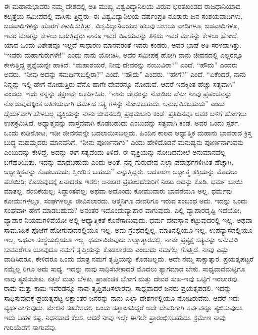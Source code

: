ಈ ಮಹಾನುಭಾವರು ನಮ್ಮ ದೇಶದಲ್ಲಿ ಅತಿ ಮುಖ್ಯ ವಿಶ್ವವಿದ್ಯಾನಿಲಯ ವಿರುವ ಭರತಖಂಡದ ರಾಜಧಾನಿಯಾದ ಕಲ್ಕತ್ತೆಯ ಸಮೀಪದಲ್ಲಿ ವಾಸಿಸು ತ್ತಿದ್ದರು. ಈ ವಿಶ್ವವಿದ್ಯಾನಿಲಯ ವರ್ಷಂಪ್ರತಿ ನೂರಾರು ಜನ ಸಂಶಯವಾದಿಗಳು, ಜಡವಾದಿಗಳನ್ನು ಹೊರಗೆ ಕಳುಹಿಸುತ್ತಿತ್ತು. ವಿಶ್ವವಿದ್ಯಾನಿಲಯದ ಹಲವು ಸಂಶಯ ವಾದಿಗಳೂ, ಜಡವಾದಿಗಳೂ, ಇವರ ಮಾತನ್ನು ಕೇಳಲು ಬರುತ್ತಿದ್ದರು.ನಾನೂ ಇವರ ವಿಷಯವನ್ನು ತಿಳಿದು ಇವರ ಮಾತನ್ನು ಕೇಳಲು ಹೋದೆ. ಯಾವ ಒಂದು ವಿಶೇಷವೂ ಇಲ್ಲದೆ ಸಾಧಾರಣ ಮಾನವರಂತೆ ಇವರು ಕಂಡರು, ಅವರ ಭಾಷೆ ಅತಿ ಸರಳವಾಗಿತ್ತು. “ಇವರು ಮಹಾಗುರುಗಳೇ!” ಎಂದು ನಾನು ಯೋಚಿಸಿ, ಅವರ ಸಮೀಪಕ್ಕೆ ಹೋಗಿ ನಾನು ಜೀವನದಲ್ಲಿ ಎಲ್ಲರನ್ನೂ ಕೇಳುತ್ತಿದ್ದ ಪ್ರಶ್ನೆಯನ್ನೇ ಹಾಕಿದೆ: “ಮಹಾಶಯರೆ, ನೀವು ದೇವರನ್ನು ನಂಬುವಿರಾ?” ಎಂದೆ. “ಹೌದು” ಎಂದರು ಅವರು. “ನೀವು ಅದನ್ನು ಸಮರ್ಥಿಸಬಲ್ಲಿರಾ?” ಎಂದೆ. “ಹೌದು” ಎಂದರು. “ಹೇಗೆ?” ಎಂದೆ. “ಏಕೆಂದರೆ, ನಾನು ನಿನ್ನನ್ನು ಇಲ್ಲಿ ಹೇಗೆ ನೋಡುತ್ತಿರು ವೆನೊ ಹಾಗೇ ದೇವರನ್ನೂ ನೋಡುವೆ. ಆದರೆ ಇದಕ್ಕಿಂತ ಹೆಚ್ಚು ಸತ್ಯವಾಗಿ” ಎಂದರು. ಇದು ನನ್ನನ್ನು ತಕ್ಷಣವೇ ಆಕರ್ಷಿಸಿತು. “ನಾನು ದೇವರನ್ನು ನೋಡಿರು ವೆನು; ನಾವು ಪ್ರಪಂಚವನ್ನು ನೋಡುವುದಕ್ಕಿಂತ ಅತಿಶಯವಾಗಿ ಧರ್ಮದ ಸತ್ಯ ಗಳನ್ನು ನೋಡಬಹುದು. ಅನುಭವಿಸಬಹುದು” ಎಂದು ಧೈರ್ಯವಾಗಿ ಹೇಳಬಲ್ಲ ವ್ಯಕ್ತಿಯನ್ನು ನಾನು ಜೀವನದಲ್ಲಿ ಪ್ರಥಮಬಾರಿ ಕಂಡೆ. ಪ್ರತಿದಿನವೂ ಅವರ ಬಳಿಗೆ ಹೋಗಲು ಉಪಕ್ರಮಿಸಿದೆ. ಅಧ್ಯಾತ್ಮವನ್ನು ವಾಸ್ತವವಾಗಿ ಕೊಡಬಹುದು ಎಂಬುದನ್ನು ಸತ್ಯವಾಗಿ ಕಂಡೆ. ಅವರ ಒಂದು ಸ್ಪರ್ಶ, ಒಂದು ಕುಡಿನೋಟ, ಇಡೀ ಜೀವನವನ್ನೇ ಬದಲಾಯಿಸಬಲ್ಲದು. ಹಿಂದಿನ ಕಾಲದ ಆಧ್ಯಾತ್ಮಿಕ ಮಹಾನು ಭಾವರಾದ ಕ್ರಿಸ್ತ ಬುದ್ಧ ಮಹಮ್ಮದರು ಮಾನವನಿಗೆ, “ನೀನು ಪೂರ್ಣನಾಗು” ಎಂದು ಹೇಳಿದೊಡನೆ ಮನುಷ್ಯನು ಪೂರ್ಣನಾಗುವನು ಎಂಬುದನ್ನು ಕೇಳಿದ್ದೆ. ಅದನ್ನು ಈಗ ಸತ್ಯವೆಂದು ತಿಳಿದೆ. ಈ ವ್ಯಕ್ತಿಯನ್ನು ನೋಡಿದಮೇಲೆ ಅನುಮಾನವೆಲ್ಲ ಬಗೆಹರಿಯಿತು. ಇದನ್ನು ಮಾಡಬಹುದು ಎಂದು ಅರಿತೆ. ನನ್ನ ಗುರುದೇವ ಎಲ್ಲಾ ಪದಾರ್ಥಗಳಿಗಿಂತ ಹೆಚ್ಚಾಗಿ, ಆಧ್ಯಾತ್ಮಿಕವನ್ನು ಕೊಡಬಹುದು. ಸ್ವೀಕರಿಸ ಬಹುದು” ಎನ್ನುತ್ತಿದ್ದರು. ಆದಕಾರಣ ಅಧ್ಯಾತ್ಮ ಶಕ್ತಿಯನ್ನು ಮೊದಲು ಪಡೆಯಿರಿ; ಕೊಡುವುದಕ್ಕೆ ಏನಾದರೂ ಇರಲಿ; ಅನಂತರ ಪ್ರಪಂಚದೆದುರಿಗೆ ನಿಂತು ಅದನ್ನು ಕೊಡಿ. ಧರ್ಮ ಬಾಯಿ ಮಾತಲ್ಲ; ನಂಬಿಕೆಯಲ್ಲ; ಸಿದ್ಧಾಂತವಲ್ಲ; ಅಥವಾ ಅದೊಂದು ಕೋಮುವಾರು ಭಾವನೆಯೂ ಅಲ್ಲ. ಧರ್ಮವು ಕೋಮುಗಳಲ್ಲೂ, ಸಂಘಗಳಲ್ಲೂ ಜೀವಿಸಲಾರದು. ಆತ್ಮನಿಗೂ ದೇವರಿಗೂ ಇರುವ ಸಂಬಂಧ ಅದು. ಇದನ್ನು ಒಂದು ಸಂಘವಾಗಿ ಹೇಗೆ ಮಾಡಬಹುದು? ಅನಂತರ ಇದೊಂದುವ್ಯಾಪಾರ ವಾಗುವುದು. ಎಲ್ಲಿ ವ್ಯಾಪಾರದೃಷ್ಟಿ ಇದೆಯೋ, ವ್ಯಾಪಾರ ನಿಯಮಗಳಿವೆಯೋ ಅಲ್ಲಿ ಆಧ್ಯಾತ್ಮಿಕತೆ ಕೊನೆಗಾಣುವುದು. ಧರ್ಮ ದೇವಸ್ಥಾನ ಕಟ್ಟುವುದರಲ್ಲಿ ಇಲ್ಲ. ಅಥವಾ ಸಾಮೂಹಿಕ ಪೂಜೆಗೆ ಹೋಗುವುದರಲ್ಲಿಯೂ ಇಲ್ಲ. ಅದು ಗ್ರಂಥದಲ್ಲಿಲ್ಲ, ಮಾತಿನಲ್ಲಿಯೂ ಇಲ್ಲ, ಉಪನ್ಯಾಸದಲ್ಲಿಯೂ ಇಲ್ಲ, ಅಥವಾ ಸಂಸ್ಥೆಯಲ್ಲಿಯೂ ಇಲ್ಲ. ಧರ್ಮವಿರುವುದು ಸಾಕ್ಷಾತ್ಕಾರದಲ್ಲಿ. ನಾವೇ ಪ್ರತ್ಯಕ್ಷ ಸತ್ಯವನ್ನು ಅನುಭವಿ ಸುವವರೆಗೂ ಯಾವುದೂ ನಮಗೆ ತೃಪ್ತಿಯನ್ನು ಕೊಡಲಾರದು ಎಂಬುದು ನಮಗೆಲ್ಲ ಗೊತ್ತಿದೆ. ನಾವು ಎಷ್ಟು ವಾದಿಸಿದರೂ, ಕೇಳಿದರೂ ಒಂದು ಮಾತ್ರ ನಮಗೆ ತೃಪ್ತಿಯನ್ನು ಕೊಡಬಲ್ಲದು. ಅದೇ ನಮ್ಮ ಸಾಕ್ಷಾತ್ಕಾರ. ಪ್ರಯತ್ನಪಟ್ಟರೆ ನಮ್ಮೆಲ್ಲ ರಿಗೂ ಅದು ಸಾಧ್ಯ. ಇದನ್ನು ನಾವು ಸಾಧಿಸಬೇಕಾದರೆ ಮೊದಲು ತ್ಯಾಗಮಾಡ ಬೇಕು. ಸಾಧ್ಯವಾದಮಟ್ಟಿಗೂ ನಾವು ತ್ಯಜಿಸಬೇಕು. ಕತ್ತಲೆ ಮತ್ತು ಬೆಳಕು, ಪ್ರಾಪಂಚಿಕ ಭೋಗ ಮತ್ತು ದೇವರ ಸುಖ-ಇವು ಒಟ್ಟಿಗೆ ಇರಲಾರವು. ರಾಮ ಮತ್ತು ಕಾಮ ಇವೆರಡನ್ನೂ ನಾವು ತೃಪ್ತಿಪಡಿಸಲಾರೆವು. ಸಾಧ್ಯವಾದರೆ ಜನರು ಪ್ರಯತ್ನಪಡಲಿ. ಇದನ್ನು ಸಾಧಿಸುವುದಕ್ಕೆ ಪ್ರಯತ್ನಪಟ್ಟ ಲಕ್ಷಾಂತರ ಜನರನ್ನು ನಾನು ಎಲ್ಲಾ ದೇಶಗಳಲ್ಲಿಯೂ ನೋಡಿರುವೆನು. ಆದರೆ ಇದು ವ್ಯರ್ಥವಾಗುವುದು. ಮೇಲಿನ ಸಂದೇಶದಲ್ಲಿ ಒಂದು ಸತ್ಯಾಂಶವಿದ್ದರೆ ಅದೇ ದೇವರಿಗಾಗಿ ಸರ್ವವನ್ನೂ ತ್ಯಜಿಸುವುದು. ಇದು ಬಹಳ ಕಷ್ಟ. ನಿಧನವಾದ ಕೆಲಸ. ಆದರೆ ನೀವು ಇಲ್ಲೇ ಈಗಲೇ ಪ್ರಾರಂಭಿಸಬಹುದು. ಕ್ರಮೇಣ ನಾವು ಗುರಿಯೆಡೆಗೆ ಸಾಗುವೆವು.

